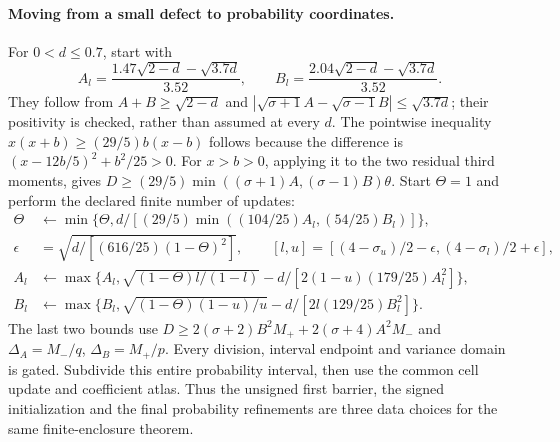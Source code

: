 \paragraph{Moving from a small defect to probability coordinates.}
For $0<d\le0.7$, start with
\[
 A_l=\frac{1.47\sqrt{2-d}-\sqrt{3.7d}}{3.52},\qquad
 B_l=\frac{2.04\sqrt{2-d}-\sqrt{3.7d}}{3.52}.
\]
They follow from $A+B\ge\sqrt{2-d}$ and
$|\sqrt{\sigma+1}A-\sqrt{\sigma-1}B|\le\sqrt{3.7d}$;
their positivity is checked, rather than assumed at every $d$.
The pointwise inequality
$x(x+b)\ge(29/5)b(x-b)$ follows because the difference is
$(x-12b/5)^2+b^2/25>0$. For $x>b>0$, applying it to the two residual
third moments, gives
$D\ge(29/5)\min((\sigma+1)A,(\sigma-1)B)\theta$.
Start $\Theta=1$ and perform the declared finite number of updates:
\begin{align*}
 \Theta&\leftarrow\min\{\Theta,d/[(29/5)
                 \min((104/25)A_l,(54/25)B_l)]\},\\
 \epsilon&=\sqrt{d/[(616/25)(1-\Theta)^2]},\qquad
 [l,u]=[(4-\sigma_u)/2-\epsilon,(4-\sigma_l)/2+\epsilon],\\
 A_l&\leftarrow\max\{A_l,\sqrt{(1-\Theta)l/(1-l)}
                           -d/[2(1-u)(179/25)A_l^2]\},\\
 B_l&\leftarrow\max\{B_l,\sqrt{(1-\Theta)(1-u)/u}
                           -d/[2l(129/25)B_l^2]\}.
\end{align*}
The last two bounds use
$D\ge2(\sigma+2)B^2M_++2(\sigma+4)A^2M_-$ and
$\Delta_A=M_-/q$, $\Delta_B=M_+/p$.
Every division, interval endpoint and variance domain is gated.
Subdivide this entire probability interval, then use the common
cell update and coefficient atlas. Thus the unsigned first barrier,
the signed initialization and the final probability refinements are
three data choices for the same finite-enclosure theorem.


